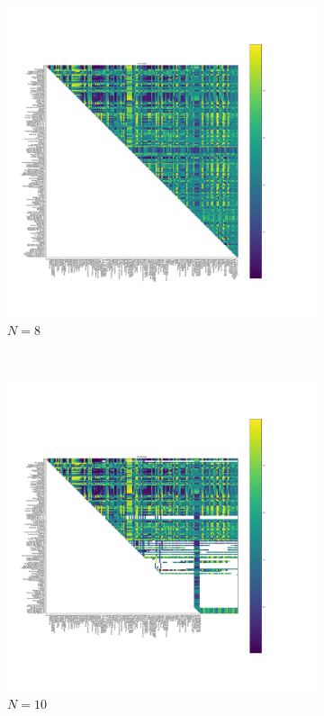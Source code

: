 \documentclass{article}
\begin{document}
\begin{figure}[!hbtp]
    \begin{subfigure}[t]{.3\textwidth}
        \centering
        \includegraphics[width=.8\textwidth]{../img/fixation_heatmap_8_std.pdf}
        \caption{\(N=8\)}
    \end{subfigure}%
    ~
    \begin{subfigure}[t]{.3\textwidth}
        \centering
        \includegraphics[width=.8\textwidth]{../img/fixation_heatmap_10_std.pdf}
        \caption{\(N=10\)}
    \end{subfigure}%
    ~
    \begin{subfigure}[t]{.3\textwidth}

\end{subfigure}
\end{figure}
\end{document}
